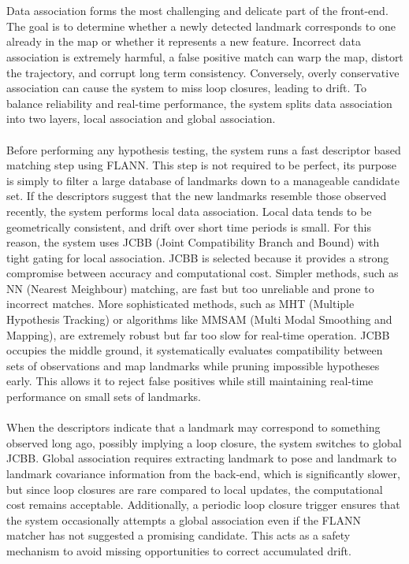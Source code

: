 \\ \\
Data association forms the most challenging and delicate part of the front-end. The goal is to determine whether a newly detected landmark corresponds to one already in the map or whether it represents a new feature. Incorrect data association is extremely harmful, a false positive match can warp the map, distort the trajectory, and corrupt long term consistency. Conversely, overly conservative association can cause the system to miss loop closures, leading to drift. To balance reliability and real-time performance, the system splits data association into two layers, local association and global association.
\\ \\
Before performing any hypothesis testing, the system runs a fast descriptor based matching step using FLANN. This step is not required to be perfect, its purpose is simply to filter a large database of landmarks down to a manageable candidate set. If the descriptors suggest that the new landmarks resemble those observed recently, the system performs local data association. Local data tends to be geometrically consistent, and drift over short time periods is small. For this reason, the system uses JCBB (Joint Compatibility Branch and Bound) with tight gating for local association. JCBB is selected because it provides a strong compromise between accuracy and computational cost. Simpler methods, such as NN (Nearest Meighbour) matching, are fast but too unreliable and prone to incorrect matches. More sophisticated methods, such as MHT (Multiple Hypothesis Tracking) or algorithms like MMSAM (Multi Modal Smoothing and Mapping), are extremely robust but far too slow for real-time operation. JCBB occupies the middle ground, it systematically evaluates compatibility between sets of observations and map landmarks while pruning impossible hypotheses early. This allows it to reject false positives while still maintaining real-time performance on small sets of landmarks.
\\ \\
When the descriptors indicate that a landmark may correspond to something observed long ago, possibly implying a loop closure, the system switches to global JCBB. Global association requires extracting landmark to pose and landmark to landmark covariance information from the back-end, which is significantly slower, but since loop closures are rare compared to local updates, the computational cost remains acceptable. Additionally, a periodic loop closure trigger ensures that the system occasionally attempts a global association even if the FLANN matcher has not suggested a promising candidate. This acts as a safety mechanism to avoid missing opportunities to correct accumulated drift.
